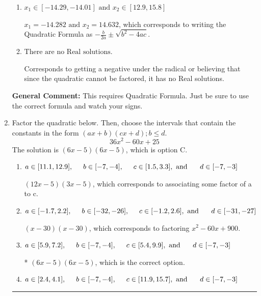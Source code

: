 \documentclass{extbook}[14pt]
\newcommand{\litem}[1]{\item #1

\rule{\textwidth}{0.4pt}}
\begin{document}
\begin{enumerate}
{\begin{enumerate}[label=\Alph*.]
 $x_1 = -3.728 \text{ and } x_2 = 10.728$, which corresponds to using the Quadratic Formula with $a=1$
\item \( x_1 \in [-14.29, -14.01] \text{ and } x_2 \in [12.9, 15.8] \)

 $x_1 = -14.282 \text{ and } x_2 = 14.632$, which corresponds to writing the Quadratic Formula as $-\frac{b}{2a} \pm \sqrt{b^2 - 4ac}$.
\item \( \text{There are no Real solutions.} \)

Corresponds to getting a negative under the radical or believing that since the quadratic cannot be factored, it has no Real solutions.
\end{enumerate}

\textbf{General Comment:} This requires Quadratic Formula. Just be sure to use the correct formula and watch your signs.
}
\litem{
Factor the quadratic below. Then, choose the intervals that contain the constants in the form $(ax+b)(cx+d); b \leq d.$
\[ 36x^{2} -60 x + 25 \]The solution is \( (6x -5)(6x -5) \), which is option C.\begin{enumerate}[label=\Alph*.]
\item \( a \in [11.1, 12.9], \hspace*{5mm} b \in [-7, -4], \hspace*{5mm} c \in [1.5, 3.3], \text{ and } \hspace*{5mm} d \in [-7, -3] \)

 $(12x -5)(3x -5)$, which corresponds to associating some factor of a to c.
\item \( a \in [-1.7, 2.2], \hspace*{5mm} b \in [-32, -26], \hspace*{5mm} c \in [-1.2, 2.6], \text{ and } \hspace*{5mm} d \in [-31, -27] \)

 $(x -30)(x -30)$, which corresponds to factoring $x^{2} -60 x + 900$.
\item \( a \in [5.9, 7.2], \hspace*{5mm} b \in [-7, -4], \hspace*{5mm} c \in [5.4, 9.9], \text{ and } \hspace*{5mm} d \in [-7, -3] \)

* $(6x -5)(6x -5)$, which is the correct option.
\item \( a \in [2.4, 4.1], \hspace*{5mm} b \in [-7, -4], \hspace*{5mm} c \in [11.9, 15.7], \text{ and } \hspace*{5mm} d \in [-7, -3] \)


\end{enumerate}}
\end{enumerate}
\end{document}

